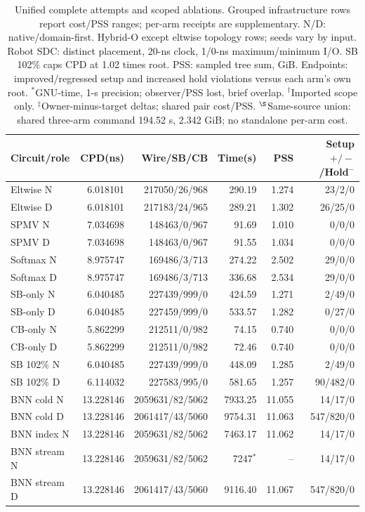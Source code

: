 \documentclass[conference,10pt]{IEEEtran}
\begin{document}
\begin{table}[t]
\centering\footnotesize\setlength{\tabcolsep}{3 pt}
\caption{Unified complete attempts and scoped ablations. Grouped infrastructure rows report cost/PSS ranges; per-arm receipts are supplementary. N/D: native/domain-first. Hybrid-O except eltwise topology rows; seeds vary by input. Robot SDC: distinct placement, 20-ns clock, 1/0-ns maximum/minimum I/O. SB 102\% caps CPD at 1.02 times root. PSS: sampled tree sum, GiB. Endpoints: improved/regressed setup and increased hold violations versus each arm's own root. $^{*}$GNU-time, 1-s precision; observer/PSS lost, brief overlap. $^{\dagger}$Imported scope only. $^{\ddagger}$Owner-minus-target deltas; shared pair cost/PSS. $^{\S}$Same-source union: shared three-arm command 194.52 s, 2.342 GiB; no standalone per-arm cost.}
\label{tab:completecost}
\begin{tabular}{lrrrrr}\hline
Circuit/role & CPD(ns) & Wire/SB/CB & Time(s) & PSS & Setup $+/-$/Hold$^-$\\\hline
Eltwise N&6.018101&217050/26/968&290.19&1.274&23/2/0\\
Eltwise D&6.018101&217183/24/965&289.21&1.302&26/25/0\\
SPMV N&7.034698&148463/0/967&91.69&1.010&0/0/0\\
SPMV D&7.034698&148463/0/967&91.55&1.034&0/0/0\\
Softmax N&8.975747&169486/3/713&274.22&2.502&29/0/0\\
Softmax D&8.975747&169486/3/713&336.68&2.534&29/0/0\\
SB-only N&6.040485&227439/999/0&424.59&1.271&2/49/0\\
SB-only D&6.040485&227459/999/0&533.57&1.282&0/27/0\\
CB-only N&5.862299&212511/0/982&74.15&0.740&0/0/0\\
CB-only D&5.862299&212511/0/982&72.46&0.740&0/0/0\\
SB 102\% N&6.040485&227439/999/0&448.09&1.285&2/49/0\\
SB 102\% D&6.114032&227583/995/0&581.65&1.257&90/482/0\\
BNN cold N&13.228146&2059631/82/5062&7933.25&11.055&14/17/0\\
BNN cold D&13.228146&2061417/43/5060&9754.31&11.063&547/820/0\\
BNN index N&13.228146&2059631/82/5062&7463.17&11.062&14/17/0\\
BNN stream N&13.228146&2059631/82/5062&7247$^{*}$&--&14/17/0\\
BNN stream D&13.228146&2061417/43/5060&9116.40&11.067&547/820/0\\

\end{tabular}
\end{table}
\end{document}

